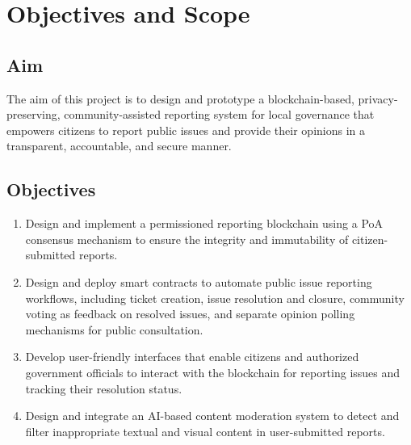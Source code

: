 \section{Objectives and Scope}
\subsection{Aim}

The aim of this project is to design and prototype a blockchain-based, privacy-preserving, community-assisted reporting system for local governance that empowers citizens to report public issues and provide their opinions in a transparent, accountable, and secure manner.

\subsection{Objectives}

\begin{enumerate}
\item Design and implement a permissioned reporting blockchain using a \ac{PoA} consensus mechanism to ensure the integrity and immutability of citizen-submitted reports.


\item Design and deploy smart contracts to automate public issue reporting workflows, including ticket creation, issue resolution and closure, community voting as feedback on resolved issues, and separate opinion polling mechanisms for public consultation.

\item Develop user-friendly interfaces that enable citizens and authorized government officials to interact with the blockchain for reporting issues and tracking their resolution status.

\item Design and integrate an \ac{AI}-based content moderation system to detect and filter inappropriate textual and visual content in user-submitted reports.


\end{enumerate}


